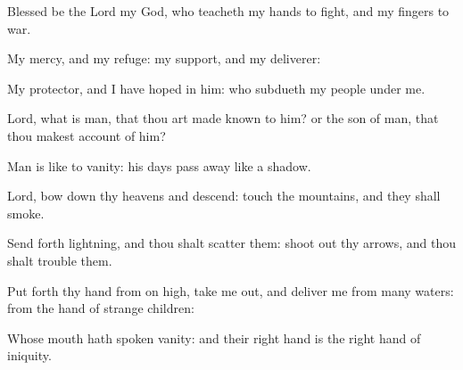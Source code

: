 ﻿\item Blessed be the Lord my God, who teacheth my hands to fight, and my fingers to war.
\item My mercy, and my refuge: my support, and my deliverer:
\item My protector, and I have hoped in him: who subdueth my people under me.
\item Lord, what is man, that thou art made known to him? or the son of man, that thou makest account of him?
\item Man is like to vanity: his days pass away like a shadow.
\item Lord, bow down thy heavens and descend: touch the mountains, and they shall smoke.
\item Send forth lightning, and thou shalt scatter them: shoot out thy arrows, and thou shalt trouble them.
\item Put forth thy hand from on high, take me out, and deliver me from many waters: from the hand of strange children:
\item Whose mouth hath spoken vanity: and their right hand is the right hand of iniquity.